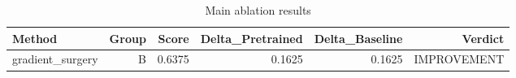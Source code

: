 \begin{table}[htbp]
\centering
\caption{Main ablation results}
\label{tab:main-results}
\begin{tabular}{lrrrrr}
\toprule
\textbf{Method} & \textbf{Group} & \textbf{Score} & \textbf{Delta\_Pretrained} & \textbf{Delta\_Baseline} & \textbf{Verdict} \\
\midrule
gradient\_surgery & B & 0.6375 & 0.1625 & 0.1625 & IMPROVEMENT \\
\bottomrule
\end{tabular}
\end{table}